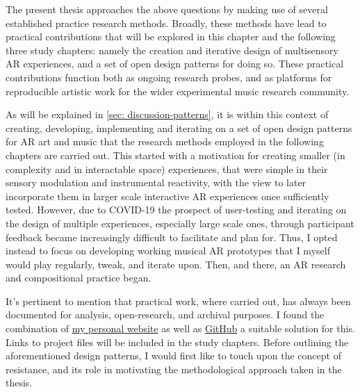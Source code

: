 The present thesis approaches the above questions by making use of several established practice research methods. Broadly, these methods have lead to practical contributions that will be explored in this chapter and the following three study chapters: namely the creation and iterative design of multisensory AR experiences, and a set of open design patterns for doing so. These practical contributions function both as ongoing research probes, and as platforms for reproducible artistic work for the wider experimental music research community. 

As will be explained in \autoref{sec: discussion-patterns}, it is within this context of creating, developing, implementing and iterating on a set of open design patterns for AR art and music that the research methods employed in the following chapters are carried out. This started with a motivation for creating smaller (in complexity and in interactable space) experiences, that were simple in their sensory modulation and instrumental reactivity, with the view to later incorporate them in larger scale interactive AR experiences once sufficiently tested. However, due to COVID-19 the prospect of user-testing and iterating on the design of multiple experiences, especially large scale ones, through participant feedback became increasingly difficult to facilitate and plan for. Thus, I opted instead to focus on developing working musical AR prototypes that I myself would play regularly, tweak, and iterate upon. Then, and there, an AR research and compositional practice began.

It's pertinent to mention that practical work, where carried out, has always been documented for analysis, open-research, and archival purposes. I found the combination of \href{https://sambilbow.github.io}{my personal website} as well as \href{https://github.com/sambilbow}{GitHub} a suitable solution for this. Links to project files will be included in the study chapters. Before outlining the aforementioned design patterns, I would first like to touch upon the concept of resistance, and its role in motivating the methodological approach taken in the thesis.



